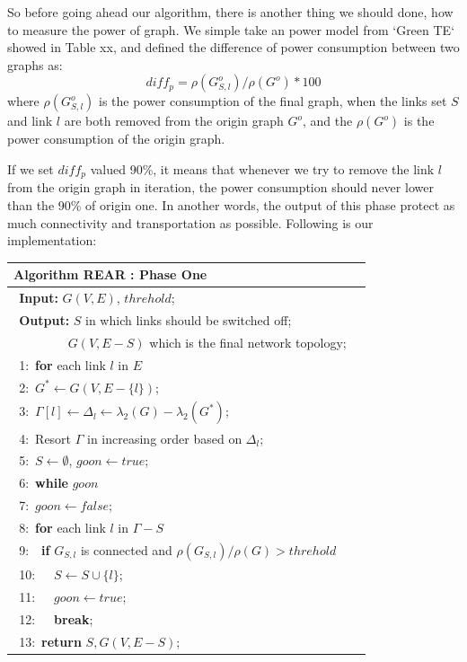 \documentclass[conference]{IEEEtran}
\begin{document}
So before going ahead our algorithm, there is another thing we should done, how to measure the power of graph.
We simple take an power model from `Green TE` showed in Table xx, and defined the difference of power consumption 
between two graphs as:
\begin{equation}
	diff_p = \rho(G_{S, l}^o) / \rho(G^o) * 100
\end{equation}
where $\rho(G_{S, l}^o)$ is the power consumption of the final graph, when the links set $S$ and 
link $l$ are both removed from the origin graph $G^o$, and the $\rho(G^o)$ is the power consumption of 
the origin graph.


If we set $diff_p$ valued 90\%, it means that whenever we try to remove the link $l$ from the origin graph in 
iteration, the power consumption should never lower than the 90\% of origin one. In another words, the output 
of this phase protect as much connectivity and transportation as possible. Following is our implementation: 


\begin{table}[!th]
\begin{tabular}{ll}
\hline
\textbf{Algorithm REAR : Phase One}\\
\hline
$\:\:$\textbf{Input:} $G(V, E)$, $threhold$;\\
$\:\:$\textbf{Output:} $S$ in which links should be switched off;\\
$\quad\qquad\quad$ $G(V, E-S)$ which is the final network topology;\\
$\:\:$1:\ \textbf{for} {each link $l$ in $E$}\\
$\:\:$2:\quad\ $G^* \leftarrow G(V, E-\{l\})$;\\
$\:\:$3:\quad\ $\Gamma[l] \leftarrow \Delta_l \leftarrow \lambda_2(G) - \lambda_2(G^*)$;\\
$\:\:$4:\ Resort $\Gamma$ in increasing order based on $\Delta_l$;\\
$\:\:$5:\ $S \leftarrow \emptyset$, $goon \leftarrow true$;\\
$\:\:$6:\ \textbf{while} {$goon$}\\
$\:\:$7:\quad\  $goon \leftarrow false$;\\
$\:\:$8:\quad\ \textbf{for} {each link $l$ in $\Gamma - S$}\\
$\:\:$9:\quad\ \quad\ \textbf{if} $G_{S,l}$ is connected and $\rho(G_{S,l})/\rho(G)>threhold$\\
$\:\:$10:\quad\ \quad\ \quad\ $S \leftarrow S \cup \{l\}$;\\
$\:\:$11:\quad\ \quad\ \quad\ $goon \leftarrow true$;\\
$\:\:$12:\quad\ \quad\ \quad\ \textbf{break};\\
$\:\:$13:\ \textbf{return} $S, G(V, E-S)$;\\
\hline
\end{tabular}
\end{table}
\end{document}
